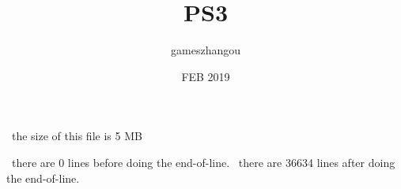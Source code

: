 \documentclass{article}
\title{PS3}
\author{gameszhangou }
\date{ FEB 2019 }
\begin{document}
\
the size of this file is 5 MB

\
there are  0 lines before doing the end-of-line.
\
there are 36634 lines after doing the end-of-line.
\end{document}
